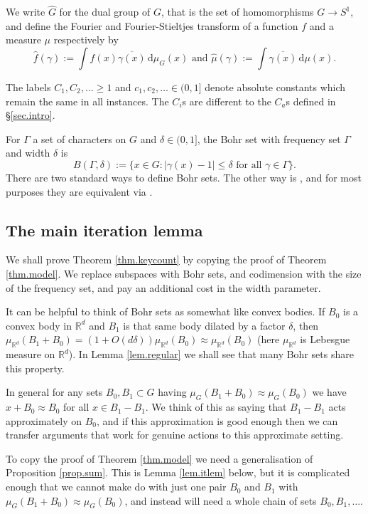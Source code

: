 \documentclass[12pt,reqno]{amsart}
\providecommand{\R}{\mathbb{R}}
\providecommand{\wh}{\widehat}
\newcommand{\dd}{\,\mathrm{d}}
\numberwithin{equation}{section}
\begin{document}
We write $\wh{G}$ for the dual group of $G$, that is the set of homomorphisms $G \rightarrow S^1$, and define the Fourier and Fourier-Stieltjes transform of a function $f$ and a measure $\mu$ respectively by
\begin{equation*}
\wh{f}(\gamma):=\int{f(x)\overline{\gamma(x)}\dd\mu_G(x)} \text{ and } \wh{\mu}(\gamma):=\int{\overline{\gamma(x)}\dd\mu(x)}.
\end{equation*}

The labels $C_1,C_2,\dots \geq 1$ and $c_1,c_2,\dots \in (0,1]$ denote absolute constants which remain the same in all instances. The $C_i$s are different to the $C_a$s defined in \S\ref{sec.intro}.

For $\Gamma$ a set of characters on $G$ and $\delta \in (0,1]$, the Bohr set with frequency set $\Gamma$ and width $\delta$ is
\begin{equation*}
B(\Gamma,\delta):=\{x \in G: |\gamma(x)-1| \leq \delta \text{ for all }\gamma \in \Gamma\}.
\end{equation*}
There are two standard ways to define Bohr sets. The other way is \cite[\S4.4, p187]{taovu::}, and for most purposes they are equivalent via \cite[(4.25), p187]{taovu::}. 

\subsection{The main iteration lemma}\label{sec.mil} We shall prove Theorem \ref{thm.keycount} by copying the proof of Theorem \ref{thm.model}. We replace subspaces with Bohr sets, and codimension with the size of the frequency set, and pay an additional cost in the width parameter. 

It can be helpful to think of Bohr sets as somewhat like convex bodies.  If $B_0$ is a convex body in $\R^d$ and $B_1$ is that same body dilated by a factor $\delta$, then $\mu_{\R^d}(B_1+B_0)=(1+O(d\delta))\mu_{\R^d}(B_0)\approx \mu_{\R^d}(B_0)$ (here $\mu_{\R^d}$ is Lebesgue measure on $\R^d$). In Lemma \ref{lem.regular} we shall see that many Bohr sets share this property.

In general for any sets $B_0,B_1 \subset G$ having $\mu_G(B_1+B_0) \approx \mu_G(B_0)$ we have $x+B_0 \approx B_0$ for all $x \in B_1-B_1$. We think of this as saying that $B_1-B_1$ acts approximately on $B_0$, and if this approximation is good enough then we can transfer arguments that work for genuine actions to this approximate setting. 

To copy the proof of Theorem \ref{thm.model} we need a generalisation of Proposition \ref{prop.sum}. This is Lemma \ref{lem.itlem} below, but it is complicated enough that we cannot make do with just one pair $B_0$ and $B_1$ with $\mu_G(B_1+B_0)\approx \mu_G(B_0)$, and instead will need a whole chain of sets $B_0,B_1,\dots$.
\end{document}
